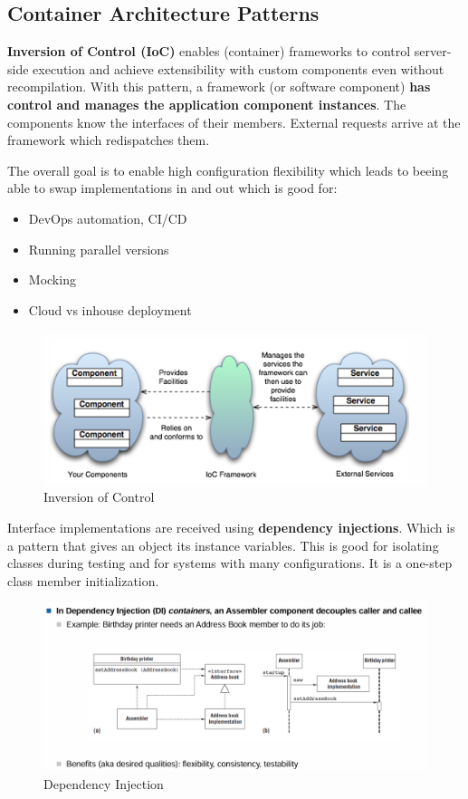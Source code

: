 \documentclass[../Main.tex]{subfiles}
\begin{document}
\subsection{Container Architecture Patterns}
\textbf{Inversion of Control (IoC)} enables (container) frameworks to control server-side execution
and achieve extensibility with custom components even without recompilation.
With this pattern, a framework (or software component) \textbf{has control and manages the application component instances}.
The components know the interfaces of their members.
External requests arrive at the framework which redispatches them.

The overall goal is to enable high configuration flexibility
which leads to beeing able to swap implementations in and out which
is good for:
\begin{itemize}
    \item DevOps automation, CI/CD
    \item Running parallel versions
    \item Mocking
    \item Cloud vs inhouse deployment
\end{itemize}

\begin{figure}[H]
    \centering
    \includegraphics[width=1\linewidth]{Images/ioc.png}
    \caption{Inversion of Control}
\end{figure}

Interface implementations are received using \textbf{dependency injections}.
Which is a pattern that gives an object its instance variables.
This is good for isolating classes during testing and for systems
with many configurations. It is a one-step class member initialization.

\begin{figure}[H]
    \centering
    \includegraphics[width=1\linewidth]{Images/dep-injection.png}
    \caption{Dependency Injection}
\end{figure}
\end{document}
